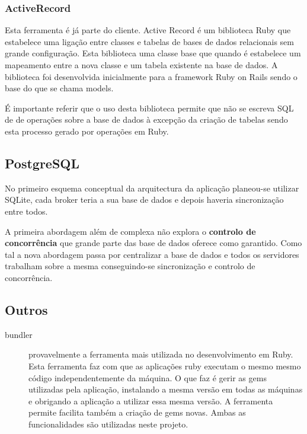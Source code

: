 

\subsubsection{ActiveRecord}
Esta ferramenta é já parte do cliente.
Active Record é um biblioteca Ruby que estabelece uma ligação entre classes e tabelas de bases de dados relacionais sem grande configuração. Esta biblioteca uma classe base que quando é estabelece um mapeamento entre a nova classe e um tabela existente na base de dados. A biblioteca foi desenvolvida inicialmente para a framework Ruby on Rails sendo o base do que se chama models.

É importante referir que o uso desta biblioteca permite que não se escreva SQL de de operações sobre a base de dados à excepção da criação de tabelas sendo esta processo gerado por operações em Ruby.

\subsection{PostgreSQL}
\label{sec:intro-postgres}
No primeiro esquema conceptual da arquitectura da aplicação planeou-se utilizar SQLite, cada broker teria a sua base de dados e depois haveria sincronização entre todos.

A primeira abordagem além de complexa não explora o \textbf{controlo de concorrência} que grande parte das base de dados oferece como garantido. Como tal a nova abordagem passa por centralizar a base de dados e todos os servidores trabalham sobre a mesma conseguindo-se sincronização e controlo de concorrência.

\subsection{Outros}
\begin{description}
\item[bundler] provavelmente a ferramenta mais utilizada no desenvolvimento em Ruby. Esta ferramenta faz com que as aplicações ruby executam o mesmo mesmo código independentemente da máquina. O que faz é gerir as gems utilizadas pela aplicação, instalando a mesma versão em todas as máquinas e obrigando a aplicação a utilizar essa mesma versão. A ferramenta permite facilita também a criação de gems novas. Ambas as funcionalidades são utilizadas neste projeto.
\end{description}

